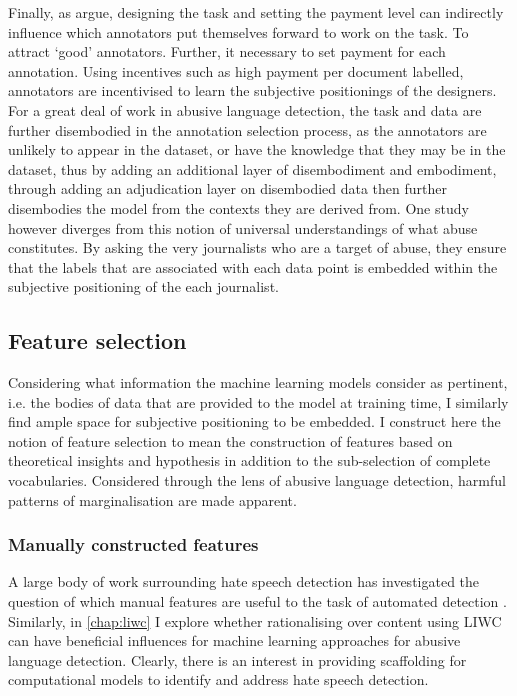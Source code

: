 Finally, as \citet{Sabou:2014} argue, designing the task and setting the payment level can indirectly influence which annotators put themselves forward to work on the task. To attract `good' annotators. Further, it necessary to set payment for each annotation. Using incentives such as high payment per document labelled, annotators are incentivised to learn the subjective positionings of the designers. For a great deal of work in abusive language detection, the task and data are further disembodied in the annotation selection process, as the annotators are unlikely to appear in the dataset, or have the knowledge that they may be in the dataset, thus by adding an additional layer of disembodiment and embodiment, through adding an adjudication layer on disembodied data then further disembodies the model from the contexts they are derived from. One study however diverges from this notion of universal understandings of what abuse constitutes. By asking the very journalists who are a target of abuse, they ensure that the labels that are associated with each data point is embedded within the subjective positioning of the each journalist.


\subsection{Feature selection}

Considering what information the machine learning models consider as pertinent, i.e. the bodies of data that are provided to the model at training time, I similarly find ample space for subjective positioning to be embedded. I construct here the notion of feature selection to mean the construction of features based on theoretical insights and hypothesis in addition to the sub-selection of complete vocabularies. Considered through the lens of abusive language detection, harmful patterns of marginalisation are made apparent.\vspace{5mm}

\subsubsection{Manually constructed features}

A large body of work surrounding hate speech detection has investigated the question of which manual features are useful to the task of automated detection \citep{Waseem:2016,Chiril:2019,Fortuna:2018,Stankovic:2020}. Similarly, in \autoref{chap:liwc} I explore whether rationalising over content using LIWC can have beneficial influences for machine learning approaches for abusive language detection. Clearly, there is an interest in providing scaffolding for computational models to identify and address hate speech detection.

